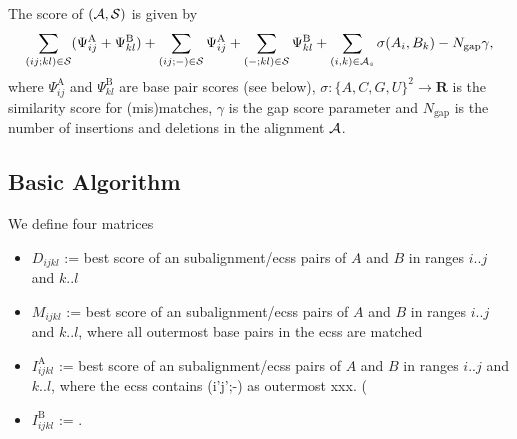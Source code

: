 \documentclass{article}
\newcommand{\myA}{{\cal A}}
\newcommand{\myS}{{\cal S}}
\newcommand{\myR}{{\mathbf R}}
\newcommand{\Gmat}[4]{D_{#1 #2 #3 #4}}
\newcommand{\Mmat}[4]{M_{#1 #2 #3 #4}}
\newcommand{\IAmat}[4]{I^\textrm{A}_{#1 #2 #3 #4}}
\newcommand{\IBmat}[4]{I^\textrm{B}_{#1 #2 #3 #4}}
\newcommand{\PsiA}[1]{\Psi^\textrm{A}_{#1}}
\newcommand{\PsiB}[1]{\Psi^\textrm{B}_{#1}}
\begin{document}
The score of $(\myA,\myS)$ is given by
\begin{equation}
  \label{eq:simscore}
  \sum_{(ij;kl)\in\myS} (\PsiA{ij}+\PsiB{kl})
  + \sum_{(ij;-)\in\myS} \PsiA{ij}
  + \sum_{(-;kl)\in\myS} \PsiB{kl}
  + \sum_{(i,k)\in\myA_s} \sigma(A_i,B_k) 
  - N_{\textrm{gap}}\gamma,
\end{equation}
where $\PsiA{ij}$ and $\PsiB{kl}$ are base pair scores (see below), $\sigma:\{A,C,G,U\}^2\to\myR$ is the similarity score for
(mis)matches, $\gamma$ is the gap score parameter and $N_{\textrm{gap}}$ is
the number of insertions and deletions in the alignment $\myA$.

\subsection{Basic Algorithm}
We define four matrices
\begin{itemize}
\item $\Gmat{i}{j}{k}{l}$ := best score of an subalignment/ecss pairs of $A$ and $B$
  in ranges ${i..j}$ and ${k..l}$
\item $\Mmat{i}{j}{k}{l}$ := best score of an subalignment/ecss pairs
  of $A$ and $B$ in ranges ${i..j}$ and ${k..l}$, where all outermost
  base pairs in the ecss are matched
\item $\IAmat{i}{j}{k}{l}$ := best score of an subalignment/ecss pairs
  of $A$ and $B$ in ranges ${i..j}$ and ${k..l}$, where the ecss
  contains (i'j';-) as outermost xxx. (
\item $\IBmat{i}{j}{k}{l}$ := .
\end{itemize}
\end{document}
